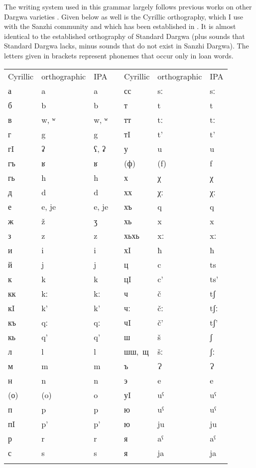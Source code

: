 \label{Orthographic conventions}

The writing system used in this grammar largely follows previous works on other Dargwa varieties \citep{Sumbatova.Mutalov2003, Sumbatova.Lander2014}. Given below as well is the Cyrillic {orthography}, which I use with the Sanzhi community and which has been established in \citet{Forker.Gadzhimuradov2017}. It is almost identical to the established {orthography} of Standard Dargwa (plus sounds that Standard Dargwa lacks, minus sounds that do not exist in Sanzhi Dargwa). The letters given in brackets represent phonemes that occur only in loan words.
%
\largerpage[2]
\begin{table}[h!]
	\centering
	\small
	\begin{tabularx}{0.8\textwidth}[]{lllXlll}
	\lsptoprule
			Cyrillic &	orthographic &	IPA	&	{}	&	Cyrillic &	orthographic &	IPA\\
		\cmidrule{1-3} \cmidrule{5-7}
			а	&	a	&	a	&	{}	&	сс	&	sː	&	sː\\
			б	&	b	&	b	&	{}	&	т	&	t	&	t\\
			в	&	w, ʷ	&	w, ʷ	&	{}	&	тт	&	tː	&	tː\\
			г	&	g 	&	g	&	{}	&	тI	&	t’	&	t’\\
			гI	&	ʡ	&	ʕ, ʡ	&	{}	&	у	&	u	&	u\\
			гъ	&	ʁ	&	ʁ	&	{}	&	(ф)	&	(f)	&	f\\
			гь	&	h	&	h	&	{}	&	х	&	χ	&	χ\\
			д	&	d	&	d	&	{}	&	хх	&	χː	&	χː\\
			е	&	e, je	&	e, je	&	{}	&	хъ	&	q	&	q\\	
			ж	&	ž	&	ʒ	&	{}	&	хь	&	x	&	x\\   
			з	&	z	&	z	&	{}	&	хьхь	&	xː	&	xː\\
			и	&	i	&	i	&	{}	&	хI	&	ħ	&	ħ\\
			й	&	j	&	j	&	{}	&	ц	&	c	&	ts\\
			к	&	k	&	k	&	{}	&	цI	&	c’	&	ts’\\
			кк	&	kː	&	kː	&	{}	&	ч	&	č	&	tʃ\\
			кI	&	k’	&	k’	&	{}	&	чː	&	čː	&	tʃː\\
			къ	&	qː	&	qː	&	{}	&	чI	&	č’	&	tʃ’\\
			кь	&	q’	&	q’	&	{}	&	ш	&	š	&	ʃ\\
			л	&	l	&	l	&	{}	&	\mbox{шш, щ}& šː	&	ʃː\\
			м	&	m	&	m	&	{}	&	ъ	&	Ɂ	&	Ɂ\\
			н	&	n	&	n	&	{}	&	э	&	e	&	e\\
			(о)	&	(o)	&	o	&	{}	&	уI	&	uˁ	&	uˁ\\
			п	&	p	&	p	&	{}	&	ю	&	uˁ	&	uˁ\\
			пI	&	p’	&	p’	&	{}	&	ю	&	ju	&	ju\\
			р	&	r	&	r	&	{}	&	я	&	aˁ	&	aˁ\\
			с	&	s	&	s	&	{}	&	я	&	ja	&	ja\\
			\lspbottomrule
	\end{tabularx}
\end{table}


